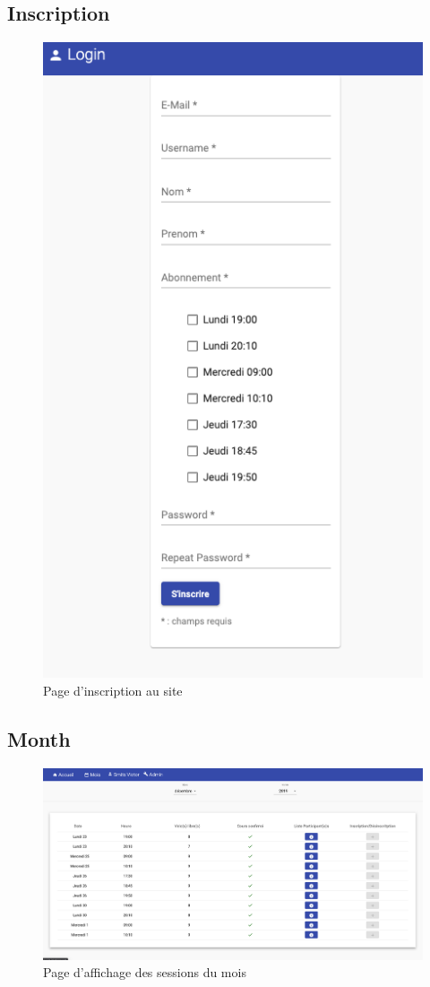        	
	\newpage
	\subsection{Inscription}
		\begin{figure}[!htbp]
       	 	\includegraphics[width=0.5\linewidth, center]{Mockup/Inscription.png}
       	 	\caption{Page d'inscription au site}
       	\end{figure}
    
       
       
	\newpage
	\subsection{Month}
		\begin{figure}[h!]
       	 	\includegraphics[width=0.8\linewidth, center]{Mockup/Month.png}
       	 	\caption{Page d'affichage des sessions du mois}
       	\end{figure}
       	

